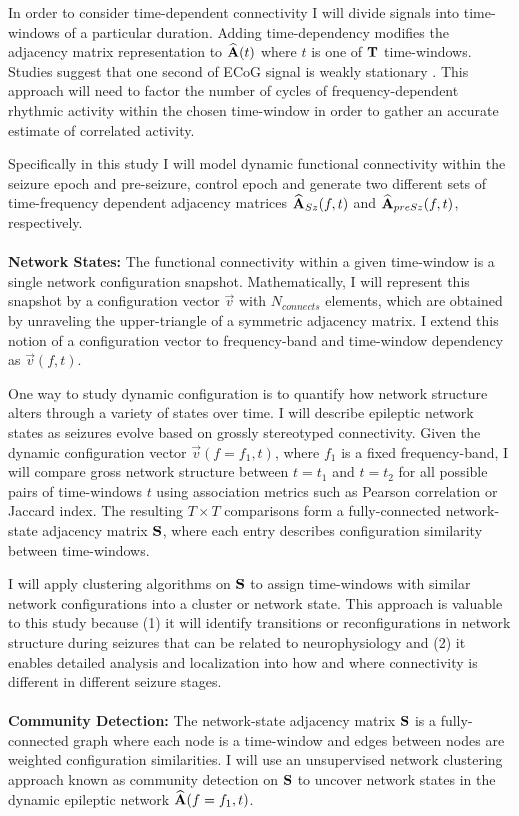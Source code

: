 In order to consider time-dependent connectivity I will divide signals into time-windows of a particular duration. Adding time-dependency modifies the adjacency matrix representation to $\widehat{\mathbf{\displaystyle A}}(t)$ where $t$ is one of $\mathbf{\displaystyle T}$ time-windows. Studies suggest that one second of ECoG signal is weakly stationary \cite{kramer2010coalescence}. This approach will need to factor the number of cycles of frequency-dependent rhythmic activity within the chosen time-window in order to gather an accurate estimate of correlated activity.

Specifically in this study I will model dynamic functional connectivity within the seizure epoch and pre-seizure, control epoch and generate two different sets of time-frequency dependent adjacency matrices $\widehat{\mathbf{\displaystyle A}}_{Sz}(f,t)$ and $\widehat{\mathbf{\displaystyle A}}_{preSz}(f,t)$, respectively.
~\\
~\\
\textbf{Network States:}
The functional connectivity within a given time-window is a single network configuration snapshot. Mathematically, I will represent this snapshot by a configuration vector $\vec{v}$ with $N_{connects}$ elements, which are obtained by unraveling the upper-triangle of a symmetric adjacency matrix. I extend this notion of a configuration vector to frequency-band and time-window dependency as $\vec{v}(f,t)$.

One way to study dynamic configuration is to quantify how network structure alters through a variety of states over time. I will describe epileptic network states as seizures evolve based on grossly stereotyped connectivity. Given the dynamic configuration vector $\vec{v}(f=f_1,t)$, where $f_{1}$ is a fixed frequency-band, I will compare gross network structure between $t=t_1$ and $t=t_2$ for all possible pairs of time-windows $t$ using association metrics such as Pearson correlation or Jaccard index. The resulting $T \times T$ comparisons form a fully-connected network-state adjacency matrix $\mathbf{\displaystyle S}$, where each entry describes configuration similarity between time-windows.

I will apply clustering algorithms on $\mathbf{\displaystyle S}$ to assign time-windows with similar network configurations into a cluster or network state. This approach is valuable to this study because (1) it will identify transitions or reconfigurations in network structure during seizures that can be related to neurophysiology and (2) it enables detailed analysis and localization into how and where connectivity is different in different seizure stages.
~\\
~\\
\textbf{Community Detection:}
The network-state adjacency matrix $\mathbf{\displaystyle S}$ is a fully-connected graph where each node is a time-window and edges between nodes are weighted configuration similarities. I will use an unsupervised network clustering approach known as community detection on $\mathbf{\displaystyle S}$ to uncover network states in the dynamic epileptic network $\widehat{\mathbf{\displaystyle A}}(f=f_1,t)$.

